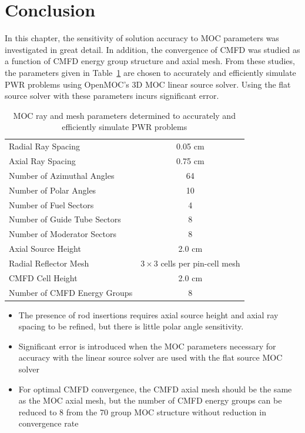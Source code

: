 \section{Conclusion}
\label{sec:sensitivity-conclusion}

In this chapter, the sensitivity of solution accuracy to \ac{MOC} parameters was investigated in great detail. In addition, the convergence of \ac{CMFD} was studied as a function of \ac{CMFD} energy group structure and axial mesh. From these studies, the parameters given in Table~\ref{tab:final-params} are chosen to accurately and efficiently simulate \ac{PWR} problems using OpenMOC's 3D \ac{MOC} linear source solver. Using the flat source solver with these parameters incurs significant error.

\begin{table}[ht]
	\centering
	\caption{MOC ray and mesh parameters determined to accurately and efficiently simulate PWR problems}
	\medskip
	\begin{tabular}{lc}
		\hline
		Radial Ray Spacing & 0.05 cm \\
		Axial Ray Spacing & 0.75 cm \\
		Number of Azimuthal Angles & 64 \\
		Number of Polar Angles & 10 \\
		\hline
		Number of Fuel Sectors & 4 \\
		Number of Guide Tube Sectors & 8 \\
		Number of Moderator Sectors & 8 \\
		Axial Source Height & 2.0 cm \\
		Radial Reflector Mesh & $3\times 3$ cells per pin-cell mesh \\
		\hline
		\ac{CMFD} Cell Height & 2.0 cm \\
		Number of \ac{CMFD} Energy Groups & 8 \\
		\hline
	\end{tabular}
	\label{tab:final-params}
\end{table}

\vfill
\begin{highlightsbox}[frametitle=Highlights]
\begin{itemize}
  \item The presence of rod insertions requires axial source height and axial ray spacing to be refined, but there is little polar angle sensitivity.
  \item Significant error is introduced when the \ac{MOC} parameters necessary for accuracy with the linear source solver are used with the flat source \ac{MOC} solver
  \item For optimal \ac{CMFD} convergence, the \ac{CMFD} axial mesh should be the same as the \ac{MOC} axial mesh, but the number of \ac{CMFD} energy groups can be reduced to 8 from the 70 group \ac{MOC} structure without reduction in convergence rate
  \end{itemize}
\end{highlightsbox}
\vfill